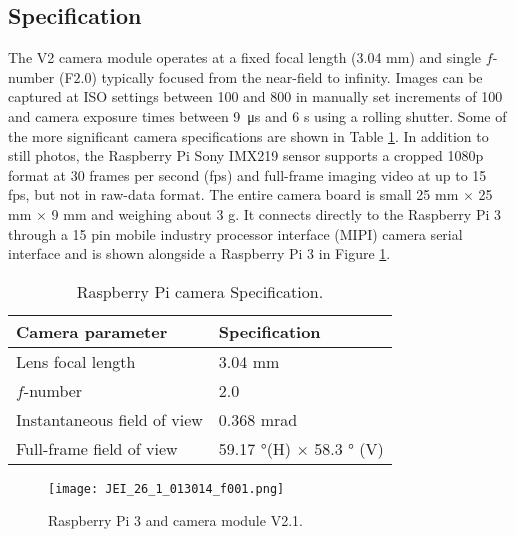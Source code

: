 \subsection{Specification}
\label{ssec:raspcamspecification}
The V2 camera module operates at a fixed focal length (3.04 \si{\milli\meter})
and single $f$-number (F$2.0$) typically focused from the near-field to
infinity. Images can be captured at ISO settings between 100 and 800 in manually
set increments of 100
and camera exposure times between \SI{9}{\micro\second} and 6 \si{\second} using
a rolling shutter. Some of the more significant camera specifications are shown
in Table \ref{tab:raspicamspec2}. In addition to still photos, the Raspberry Pi
Sony IMX219 sensor supports a cropped 1080p format at 30 frames per second (fps)
and full-frame imaging video at up to 15 fps, but not in raw-data format. The
entire camera board is small 25 \si{\milli\meter} $\times$ 25 \si{\milli\meter}
$\times$ 9 \si{\milli\meter} and weighing about $3$ \si{\gram}. \hfill \break \newline
It connects directly to the Raspberry Pi 3 through a 15 pin mobile industry processor
interface (MIPI) camera serial interface and is shown alongside a Raspberry Pi 3
in Figure \ref{fig:boardcam}.\cite{upton2016raspberry, raspberrycam}
%
\begin{table}[htb]
	\centering
	\caption{Raspberry Pi camera Specification.}
	\label{tab:raspicamspec2}
	\begin{tabular}{l l}
		\hline
		\textbf{Camera parameter}			& 	\textbf{Specification}\\
		\hline
		\rowcolor{aliceblue!85}Lens focal length 	& 	3.04 \si{\milli\meter}	\\
		$f$-number			&	2.0	\\
		\rowcolor{aliceblue!85}Instantaneous field of view	&	0.368 \si{\milli\radian}\\
		Full-frame field of view & 59.17 \si{\degree}(H) $\times$ 58.3 \si{\degree} (V)\\
		\hline
	\end{tabular}
\end{table}
%

\begin{figure}[htb]
	\centering
    \texttt{[image: JEI\_26\_1\_013014\_f001.png]}
    \caption{Raspberry Pi 3 and camera module V2.1.}
    \label{fig:boardcam}
\end{figure}